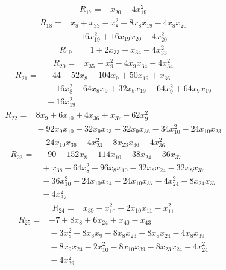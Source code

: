 \begin{align*}
R_{17} ={}& x_{20} - 4x_{19}^{2}
\end{align*}
\begin{align*}
R_{18} ={}& x_{8} + x_{33} - x_{8}^{2} + 8x_{8} x_{19} - 4x_{8} x_{20} \\
&{} -16x_{19}^{2} + 16x_{19} x_{20} - 4x_{20}^{2}
\end{align*}
\begin{align*}
R_{19} ={}& 1 + 2x_{33} + x_{34} - 4x_{33}^{2}
\end{align*}
\begin{align*}
R_{20} ={}& x_{35} - x_{9}^{2} - 4x_{9} x_{34} - 4x_{34}^{2}
\end{align*}
\begin{align*}
R_{21} ={}& -44 - 52x_{8} - 104x_{9} + 50x_{19} + x_{36} \\
&{} -16x_{8}^{2} - 64x_{8} x_{9} + 32x_{8} x_{19} - 64x_{9}^{2} + 64x_{9} x_{19} \\
&{} -16x_{19}^{2}
\end{align*}
\begin{align*}
R_{22} ={}& 8x_{9} + 6x_{10} + 4x_{36} + x_{37} - 62x_{9}^{2} \\
&{} -92x_{9} x_{10} - 32x_{9} x_{23} - 32x_{9} x_{36} - 34x_{10}^{2} - 24x_{10} x_{23} \\
&{} -24x_{10} x_{36} - 4x_{23}^{2} - 8x_{23} x_{36} - 4x_{36}^{2}
\end{align*}
\begin{align*}
R_{23} ={}& -90 - 152x_{8} - 114x_{10} - 38x_{24} - 36x_{37} \\
&{} + x_{38} - 64x_{8}^{2} - 96x_{8} x_{10} - 32x_{8} x_{24} - 32x_{8} x_{37} \\
&{} -36x_{10}^{2} - 24x_{10} x_{24} - 24x_{10} x_{37} - 4x_{24}^{2} - 8x_{24} x_{37} \\
&{} -4x_{37}^{2}
\end{align*}
\begin{align*}
R_{24} ={}& x_{39} - x_{10}^{2} - 2x_{10} x_{11} - x_{11}^{2}
\end{align*}
\begin{align*}
R_{25} ={}& -7 + 8x_{8} + 6x_{24} + x_{40} - x_{43} \\
&{} -3x_{8}^{2} - 8x_{8} x_{9} - 8x_{8} x_{23} - 8x_{8} x_{24} - 4x_{8} x_{39} \\
&{} -8x_{9} x_{24} - 2x_{10}^{2} - 8x_{10} x_{39} - 8x_{23} x_{24} - 4x_{24}^{2} \\
&{} -4x_{39}^{2}
\end{align*}
